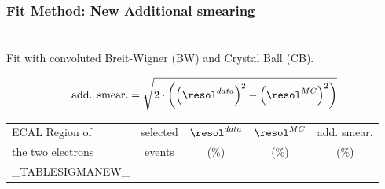 \color{titlecolor}
\begin{frame}
  \frametitle{Fit Method: New Additional smearing}
  \framesubtitle{\invMassVarName}
 \\
  Fit with convoluted Breit-Wigner (BW) and Crystal Ball (CB).

  $$ \text{add. smear.}  = \sqrt{2 \cdot \left( \left(\resol^{data}\right)^2 - \left(\resol^{MC}\right)^2 \right)}$$

  
  \begin{center}
    \emph{\dataSample}\xspace \invMassVarName

    \begin{tabular}{|l|c|c|c|c|} \hline
      ECAL Region of & selected  & $\resol^{data}$ & $\resol^{MC}$  & add. smear. \\
      the two electrons & events & (\%) & (\%) & (\%) \\
      \hline
      \hline
      _TABLESIGMANEW_
      \hline		
    \end{tabular}
  \end{center}
\end{frame}


